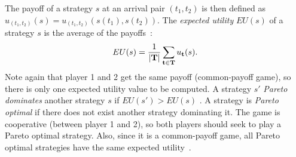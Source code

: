 
The payoff of a strategy $s$ at an arrival pair $(t_1,t_2)$ is then defined as $u_{(t_1,t_2)}(s) = u_{(t_1,t_2)} (s(t_1),s(t_2))$.  
The \emph{expected utility} $EU(s)$ of a strategy $s$ is the average of the payoffs~\cite{shoham2008multiagent}:
\[
 EU(s) = \frac{1}{|  {\bf T} |} \sum_{{\bf t} \in \bf T} u_\mathbf{t}(s). %
\]
Note again that player 1 and 2 get the same payoff (common-payoff game), so there is only one expected utility value to be computed. A strategy $s'$ \emph{Pareto dominates} another strategy $s$ if $EU(s') > EU(s)$ \cite{shoham2008multiagent}. 
A strategy is \emph{Pareto optimal} if there does not exist another strategy dominating it. %
The game is cooperative (between player 1 and 2), so both players should seek to play a Pareto optimal strategy. Also, since it is a common-payoff game, all Pareto optimal strategies have the same expected utility~\cite{shoham2008multiagent}. 

